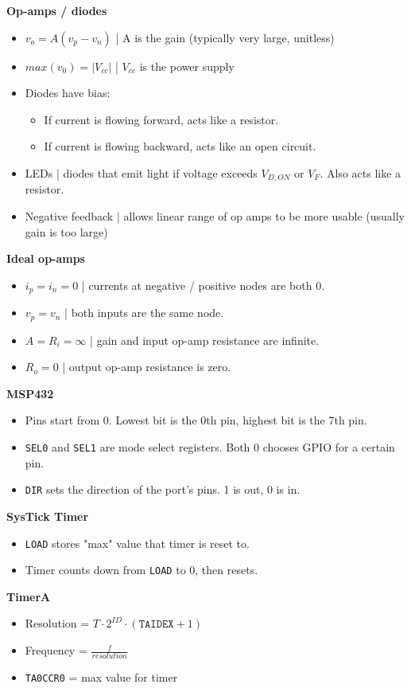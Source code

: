 \documentclass{article}
\begin{document}
\textbf{Op-amps / diodes}
\begin{itemize}
    \item $v_o = A(v_p - v_n)$ | A is the gain (typically very large, unitless)
    \item $max(v_0) = |V_{cc}|$ | $V_{cc}$ is the power supply
    \item Diodes have bias:
    \begin{itemize}
        \item If current is flowing forward, acts like a resistor.
        \item If current is flowing backward, acts like an open circuit.
    \end{itemize}
    \item LEDs | diodes that emit light if voltage exceeds $V_{D,ON}$ or $V_F$. Also acts like a resistor.
    \item Negative feedback | allows linear range of op amps to be more usable (usually gain is too large)
\end{itemize}
\textbf{Ideal op-amps}
\begin{itemize}
    \item $i_p = i_n = 0$ | currents at negative / positive nodes are both 0.
    \item $v_p = v_n$ | both inputs are the same node.
    \item $A = R_i = \infty$ | gain and input op-amp resistance are infinite.
    \item $R_o = 0$ | output op-amp resistance is zero.
\end{itemize}
\textbf{MSP432}
\begin{itemize}
    \item Pins start from 0. Lowest bit is the 0th pin, highest bit is the 7th pin.
    \item \texttt{SEL0} and \texttt{SEL1} are mode select registers. Both 0 chooses GPIO for a certain pin.
    \item \texttt{DIR} sets the direction of the port's pins. 1 is out, 0 is in.
\end{itemize}
\textbf{SysTick Timer}
\begin{itemize}
    \item \texttt{LOAD} stores "max" value that timer is reset to.
    \item Timer counts down from \texttt{LOAD} to 0, then resets.
\end{itemize}
\textbf{TimerA}
\begin{itemize}
    \item Resolution = $T \cdot 2^{ID} \cdot (\texttt{TAIDEX} + 1)$
    \item Frequency = $\frac{f}{resolution}$
    \item \texttt{TA0CCR0} = max value for timer
\end{itemize}
\end{document}
